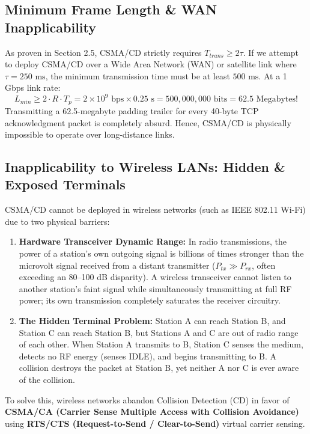 \documentclass[12pt, a4paper]{article}
\begin{document}
\subsection{Minimum Frame Length \& WAN Inapplicability}
As proven in Section 2.5, CSMA/CD strictly requires $T_{trans} \ge 2\tau$. If we attempt to deploy CSMA/CD over a Wide Area Network (WAN) or satellite link where $\tau = 250\text{ ms}$, the minimum transmission time must be at least $500\text{ ms}$. At a 1 Gbps link rate:
\begin{equation}
    L_{min} \ge 2 \cdot R \cdot T_p = 2 \times 10^9 \text{ bps} \times 0.25 \text{ s} = 500{,}000{,}000 \text{ bits} = 62.5 \text{ Megabytes!}
\end{equation}
Transmitting a 62.5-megabyte padding trailer for every 40-byte TCP acknowledgment packet is completely absurd. Hence, CSMA/CD is physically impossible to operate over long-distance links.

\subsection{Inapplicability to Wireless LANs: Hidden \& Exposed Terminals}
CSMA/CD cannot be deployed in wireless networks (such as IEEE 802.11 Wi-Fi) due to two physical barriers:
\begin{enumerate}
    \item \textbf{Hardware Transceiver Dynamic Range:} In radio transmissions, the power of a station's own outgoing signal is billions of times stronger than the microvolt signal received from a distant transmitter ($P_{tx} \gg P_{rx}$, often exceeding an 80--100 dB disparity). A wireless transceiver cannot listen to another station's faint signal while simultaneously transmitting at full RF power; its own transmission completely saturates the receiver circuitry.
    \item \textbf{The Hidden Terminal Problem:} Station A can reach Station B, and Station C can reach Station B, but Stations A and C are out of radio range of each other. When Station A transmits to B, Station C senses the medium, detects no RF energy (senses IDLE), and begins transmitting to B. A collision destroys the packet at Station B, yet neither A nor C is ever aware of the collision.
\end{enumerate}
To solve this, wireless networks abandon Collision Detection (CD) in favor of \textbf{CSMA/CA (Carrier Sense Multiple Access with Collision Avoidance)} using \textbf{RTS/CTS (Request-to-Send / Clear-to-Send)} virtual carrier sensing.
\end{document}
